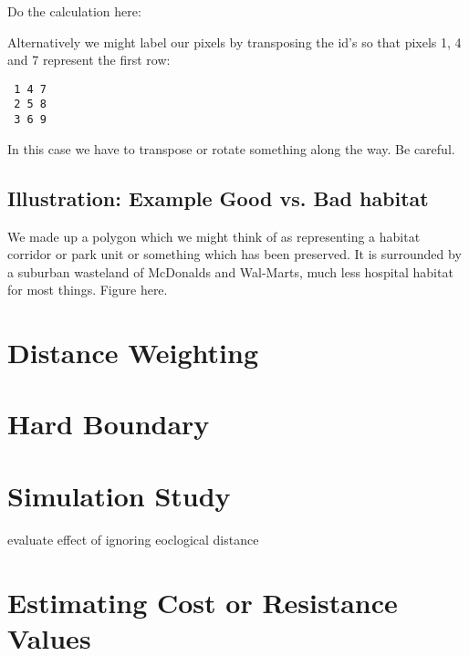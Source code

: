 Do the calculation here:

Alternatively we might label our pixels by transposing the id's so
that pixels 1, 4 and 7 represent the first row:
\begin{verbatim}
 1 4 7
 2 5 8 
 3 6 9
\end{verbatim}
In this case we have to transpose or rotate something along the way. 
Be careful. 

\subsection{Illustration: Example Good vs. Bad habitat}

We made up a polygon which we might think of as representing a habitat
corridor or park unit or something which has been preserved. It is
surrounded by a suburban wasteland of McDonalds and Wal-Marts, much
less hospital habitat for most things.
Figure here. 



\section{Distance Weighting}


\section{Hard Boundary}



\section{Simulation Study}

evaluate effect of ignoring eoclogical distance


\section{Estimating Cost or Resistance Values}




